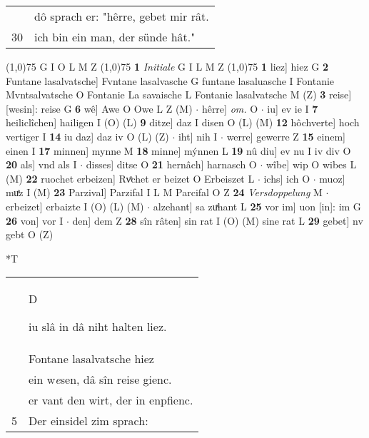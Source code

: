 \documentclass[8pt,a4paper,notitlepage]{article}
\begin{document}
\begin{table}[ht]
\begin{minipage}[t]{0.5\linewidth}
\begin{tabular}{rl}
 & dô sprach er: "hêrre, gebet mir rât.\\ 
30 & ich bin ein man, der sünde hât."\\ 
\end{tabular}
\scriptsize
\line(1,0){75} \newline
G I O L M Z \newline
\line(1,0){75} \newline
\textbf{1} \textit{Initiale} G I L M Z  \newline
\line(1,0){75} \newline
\textbf{1} liez] hiez G \textbf{2} Funtane lasalvatsche] Fvntane lasalvasche G funtane lasaluasche I Fontanie Mvntsalvatsche O Fontanie La savaische L Fontanie lasalvatsche M (Z) \textbf{3} reise] [wesin]: reise G \textbf{6} wê] Awe O Owe L Z (M)  $\cdot$ hêrre] \textit{om.} O  $\cdot$ iu] ev ie I \textbf{7} heiliclîchen] hailigen I (O) (L) \textbf{9} ditze] daz I disen O (L) (M) \textbf{12} hôchverte] hoch vertiger I \textbf{14} iu daz] daz iv O (L) (Z)  $\cdot$ iht] nih I  $\cdot$ werre] gewerre Z \textbf{15} einem] einen I \textbf{17} minnen] mynne M \textbf{18} minne] mýnnen L \textbf{19} nû diu] ev nu I iv div O \textbf{20} als] vnd als I  $\cdot$ disses] ditse O \textbf{21} hernâch] harnasch O  $\cdot$ wîbe] wip O wibes L (M) \textbf{22} ruochet erbeizen] Rvͦchet er beizet O Erbeiszet L  $\cdot$ ichs] ich O  $\cdot$ muoz] muͤz I (M) \textbf{23} Parzival] Parzifal I L M Parcifal O Z \textbf{24} \textit{Versdoppelung} M   $\cdot$ erbeizet] erbaizte I (O) (L) (M)  $\cdot$ alzehant] sa zuͯhant L \textbf{25} vor im] uon [in]: im G \textbf{26} von] vor I  $\cdot$ den] dem Z \textbf{28} sîn râten] sin rat I (O) (M) sine rat L \textbf{29} gebet] nv gebt O (Z) \newline
\end{minipage}
\hspace{0.5cm}
\begin{minipage}[t]{0.5\linewidth}
\small
\begin{center}*T
\end{center}
\begin{tabular}{rl}
 & \begin{large}D\end{large}iu slâ in dâ niht halten liez.\\ 
 & Fontane lasalvatsche hiez\\ 
 & ein w\textit{e}sen, dâ sîn reise gienc.\\ 
 & er vant den wirt, der in enpfienc.\\ 
5 & Der einsidel zim sprach:\\ 

\end{tabular}
\end{minipage}
\end{table}
\end{document}

